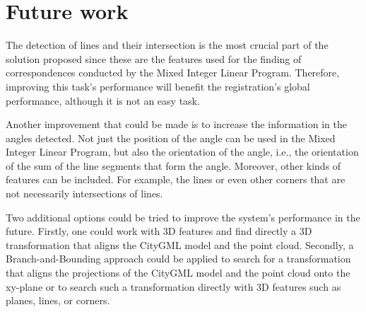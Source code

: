     
    
    \section{Future work}
        The detection of lines and their intersection is the most crucial part of the solution proposed 
        since these are the features used for the finding of correspondences conducted by the Mixed Integer Linear Program. 
        Therefore, improving this task’s performance will benefit the registration’s global performance, although it is not an easy task.

        Another improvement that could be made is to increase the information in the angles detected. 
        Not just the position of the angle can be used in the Mixed Integer Linear Program, but also the orientation of the angle, 
        i.e., the orientation of the sum of the line segments that form the angle.
        Moreover, other kinds of features can be included. For example, the lines or even other corners that are not necessarily intersections of lines.

        Two additional options could be tried to improve the system’s performance in the future. 
        Firstly, one could work with 3D features and find directly a 3D transformation that aligns the CityGML model and the point cloud. 
        Secondly, a Branch-and-Bounding approach \cite{Bazin_2013_abranchandbound,Breuel_2003_implementation,Brown_2015_globally,Brown_2019_afamily} 
        could be applied to search for a transformation that aligns the projections of the CityGML model and the point cloud onto the xy-plane 
        or to search such a transformation directly with 3D features such as planes, lines, or corners.  


